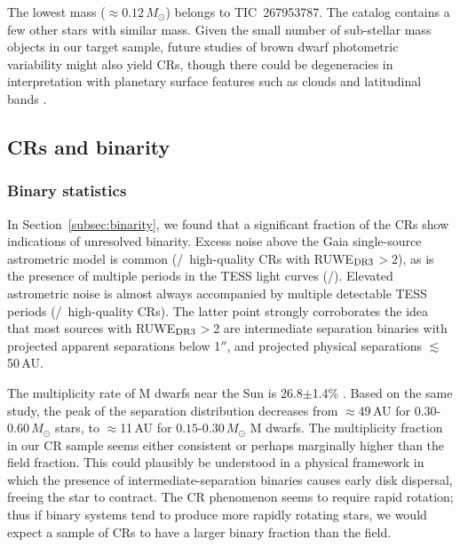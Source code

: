 \documentclass[11pt,twocolumn,tighten]{aastex63}
\begin{document}
The lowest mass ($\approx$$0.12$\,$M_\odot$) belongs to TIC~267953787.
The catalog contains a few other stars with similar mass.  Given the
small number of sub-stellar mass objects in our target sample, future
studies of brown dwarf photometric variability might also yield CRs,
though there could be degeneracies in interpretation with planetary
surface features such as clouds and latitudinal bands
\citep[e.g.][]{2021ApJ...906...64A,2022ApJ...924...68V}.


\subsection{CRs and binarity}
\label{subsec:discbinary}

\subsubsection{Binary statistics}

In Section~\ref{subsec:binarity}, we found that a significant fraction
of the CRs show indications of unresolved binarity.  Excess noise
above the Gaia single-source astrometric model is common
(\ngoodhighruwe/\ngoods\ high-quality CRs with RUWE$_{\rm DR3}$$>$2),
as is the presence of multiple periods in the TESS light curves
(\ngoodmultperiodflag/\ngoods).  Elevated astrometric noise is almost
always accompanied by multiple detectable TESS periods
(\ngoodruweandmultperiod/\ngoodhighruwe\ high-quality CRs).  The
latter point strongly corroborates the idea that most sources with
RUWE$_{\rm DR3}$$>$2 are intermediate separation binaries with
projected apparent separations below 1$''$, and projected physical
separations $\lesssim$50\,AU.

The multiplicity rate of M dwarfs near the Sun is 26.8$\pm$1.4\%
\citep{2019AJ....157..216W}.  Based on the same study, the peak of the
separation distribution decreases from $\approx$49\,AU for
$0.30$-$0.60$\,$M_\odot$ stars, to $\approx$11\,AU for
$0.15$-$0.30$\,$M_\odot$ M dwarfs.  The multiplicity fraction in our
CR sample seems either consistent or perhaps marginally higher than
the field fraction.  This could plausibly be understood in a physical
framework in which the presence of intermediate-separation binaries
causes early disk dispersal, freeing the star to contract.  The CR
phenomenon seems to require rapid rotation; thus if binary systems
tend to produce more rapidly rotating stars, we would expect a sample
of CRs to have a larger binary fraction than the field.
\end{document}
